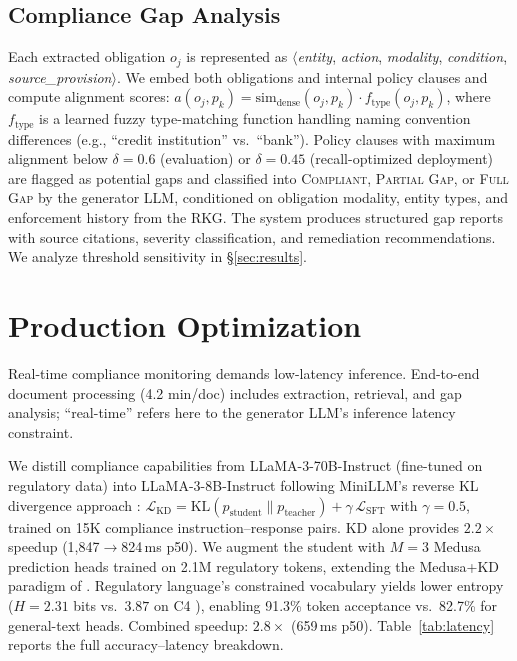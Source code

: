 \documentclass[11pt]{article}
\begin{document}
\subsection{Compliance Gap Analysis}
\label{sec:gap}

Each extracted obligation $o_j$ is represented as $\langle$\textit{entity}, \textit{action}, \textit{modality}, \textit{condition}, \textit{source\_provision}$\rangle$. We embed both obligations and internal policy clauses and compute alignment scores: $a(o_j, p_k) = \text{sim}_{\text{dense}}(o_j, p_k) \cdot f_{\text{type}}(o_j, p_k)$, where $f_{\text{type}}$ is a learned fuzzy type-matching function handling naming convention differences (e.g., ``credit institution'' vs.\ ``bank''). Policy clauses with maximum alignment below $\delta{=}0.6$ (evaluation) or $\delta{=}0.45$ (recall-optimized deployment) are flagged as potential gaps and classified into \textsc{Compliant}, \textsc{Partial Gap}, or \textsc{Full Gap} by the generator LLM, conditioned on obligation modality, entity types, and enforcement history from the RKG. The system produces structured gap reports with source citations, severity classification, and remediation recommendations. We analyze threshold sensitivity in \S\ref{sec:results}.


\section{Production Optimization}
\label{sec:optimization}

Real-time compliance monitoring demands low-latency inference. End-to-end document processing (4.2 min/doc) includes extraction, retrieval, and gap analysis; ``real-time'' refers here to the generator LLM's inference latency constraint.

We distill compliance capabilities from LLaMA-3-70B-Instruct (fine-tuned on regulatory data) into LLaMA-3-8B-Instruct following MiniLLM's reverse KL divergence approach \citep{gu2024minillm}: $\mathcal{L}_{\text{KD}} = \text{KL}(p_{\text{student}} \| p_{\text{teacher}}) + \gamma\,\mathcal{L}_{\text{SFT}}$ with $\gamma{=}0.5$, trained on 15K compliance instruction--response pairs. KD alone provides $2.2\times$ speedup (1{,}847$\to$824\,ms p50). We augment the student with $M{=}3$ Medusa prediction heads \citep{cai2024medusa} trained on 2.1M regulatory tokens, extending the Medusa+KD paradigm of \citet{zagyva2025speedwithoutsacrifice}. Regulatory language's constrained vocabulary yields lower entropy ($H{=}2.31$ bits vs.\ $3.87$ on C4 \citep{raffel2020t5}), enabling 91.3\% token acceptance vs.\ 82.7\% for general-text heads. Combined speedup: $2.8\times$ (659\,ms p50). Table~\ref{tab:latency} reports the full accuracy--latency breakdown.
\end{document}
